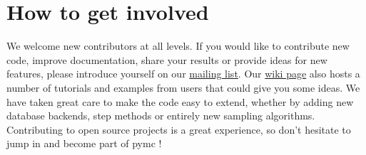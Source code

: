 \section{How to get involved} %

We welcome new contributors at all levels. If you would like to contribute new code, improve documentation, share your results or provide ideas for new features, please introduce yourself on our \href{pymc@googlegroups.com}{mailing list}. Our \href{http://code.google.com/p/pymc/w/list}{wiki page} also hosts a number of tutorials and examples from users that could give you some ideas. We have taken great care to make the code easy to extend, whether by adding new database backends, step methods or entirely new sampling algorithms. Contributing to open source projects is a great experience, so don't hesitate to jump in and become part of pymc !   


